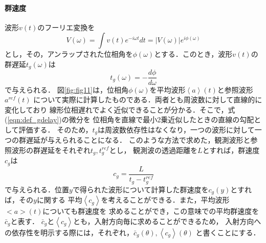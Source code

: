 \paragraph{群速度}
波形$v(t)$のフーリエ変換を
\begin{equation}
	V(\omega)=\int v(t)e^{-i\omega t} dt = \left| V(\omega) \right|e^{i\phi(\omega)}
	\label{eqn:phase}
\end{equation}
とし，その，アンラップされた位相角を$\phi(\omega)$とする．このとき，波形$v(t)$の
群遅延$t_g(\omega)$は
\begin{equation}
	t_g(\omega)=-\frac{d\phi}{d\omega}
	\label{eqn:def_gdelay}
\end{equation}
で与えられる．
図\ref{fig:fig11}は，位相角$\phi(\omega)$を平均波形$\left<a\right>(t)$と参照波形$a^{ref}(t)$
について実際に計算したものである．両者とも周波数に対して直線的に変化しており
線形位相遅れでよく近似できることが分かる．そこで，式(\ref{eqn:def_gdelay})の微分を
位相角を直線で最小2乗近似したときの直線の勾配として評価する．
そのため，$t_g$は周波数依存性はなくなり，一つの波形に対して一つの群遅延が与えられることになる．
このような方法で求めた，観測波形と参照波形の群遅延をそれぞれ$t_g, t_g^{ref}$とし，
観測波の透過距離を$L$とすれば，群速度$c_g$は
\begin{equation}
	c_g=\frac{L}{t_g-t_g^{ref}}
	\label{eqn:def_cg}
\end{equation}
で与えられる．位置$y$で得られた波形について計算した群速度を$c_g(y)$とすれば，その$y$に関する
平均$\left< c_g \right>$を考えることができる．また，平均波形$<a>(t)$についても群速度を
求めることができ，この意味での平均群速度を $\bar c_g$と表す．
$\bar c_g$と$\left< c_g \right>$とも，入射方向毎に求めることができるため，
入射方向への依存性を明示する際には，それぞれ，$\bar c_g(\theta), \left< c_g\right>(\theta)$
と書くことにする．
